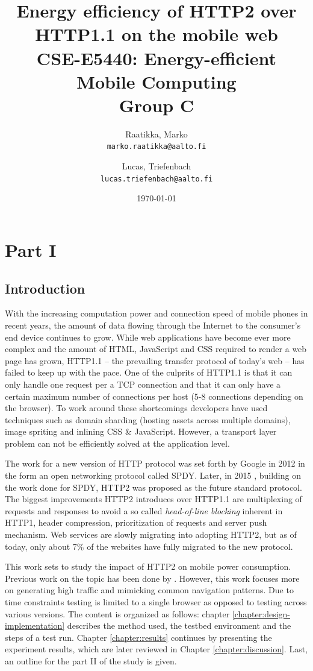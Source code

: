 \documentclass{article}
\author{
  Raatikka, Marko\\
  \texttt{marko.raatikka@aalto.fi}
  \and
  Lucas, Triefenbach\\
  \texttt{lucas.triefenbach@aalto.fi}
}
\title{Energy efficiency of HTTP2 over HTTP1.1 on the mobile web
\\
\vspace{5mm}
\large{CSE-E5440: Energy-efficient Mobile Computing\\Group C}
}
\date{\today}
\begin{document}
\maketitle
\clearpage

\section{Part I}

\subsection{Introduction}
With the increasing computation power and connection speed of mobile phones in recent years, the amount of data flowing through the Internet to the consumer's end device continues to grow. While web applications have become ever more complex and the amount of HTML, JavaScript and CSS required to render a web page has grown, HTTP1.1 -- the prevailing transfer protocol of today's web -- has failed to keep up with the pace. One of the culprits of HTTP1.1 is that it can only handle one request per a TCP connection and that it can only have a certain maximum number of connections per host (5-8 connections depending on the browser). To work around these shortcomings developers have used techniques such as domain sharding (hosting assets across multiple domains), image spriting and inlining CSS \& JavaScript. However, a transport layer problem can not be efficiently solved at the application level.

The work for a new version of HTTP protocol was set forth by Google in 2012 in the form an open networking protocol called SPDY. Later, in 2015 , building on the work done for SPDY, HTTP2 was proposed as the future standard protocol. The biggest improvements HTTP2 introduces over HTTP1.1 are multiplexing of requests and responses to avoid a so called \emph{head-of-line blocking} inherent in HTTP1, header compression, prioritization of requests and server push mechanism. Web services are slowly migrating into adopting HTTP2, but as of today, only about 7\% of the websites have fully migrated to the new protocol. \citep{google-spdy}\citep{http2_stats}\citep{http2}

This work sets to study the impact of HTTP2 on mobile power consumption. Previous work on the topic has been done by \citep{previous_work}. However, this work focuses more on generating high traffic and mimicking common navigation patterns. Due to time constraints testing is limited to a single browser as opposed to testing across various versions. The content is organized as follows: chapter \ref{chapter:design-implementation} describes the method used, the testbed environment and the steps of a test run. Chapter \ref{chapter:results} continues by presenting the experiment results, which are later reviewed in Chapter \ref{chapter:discussion}. Last, an outline for the part II of the study is given.
\end{document}
